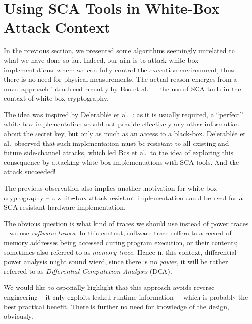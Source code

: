 \section{Using SCA Tools in White-Box Attack Context}
\label{sec:scawbc}

In the previous section, we presented some algorithms seemingly unrelated to what we have done so far. Indeed, our aim is to attack white-box implementations, where we can fully control the execution environment, thus there is no need for physical measurements. The actual reason emerges from a novel approach introduced recently by Bos et al.\ \cite{bos2015differential} -- the use of SCA tools in the context of white-box cryptography.

The idea was inspired by Delerabl{\'e}e et al.\ \cite{delerablee2013white}: as it is usually required, a ``perfect'' white-box implementation should not provide effectively any other information about the secret key, but only as much as an access to a black-box. Delerabl{\'e}e et al.\ observed that such implementation must be resistant to all existing and future side-channel attacks, which led Bos et al.\ to the idea of exploring this consequence by attacking white-box implementations with SCA tools. And the attack succeeded!

\begin{note}
\label{note:motiv}
	The previous observation also implies another motivation for white-box cryptography -- a white-box attack resistant implementation could be used for a SCA-resistant hardware implementation.
\end{note}

The obvious question is what kind of traces we should use instead of power traces -- we use {\em software traces}. In this context, software trace reffers to a record of memory addresses being accessed during program execution, or their contents; sometimes also referred to as {\em memory trace}. Hence in this context, differential power analysis might sound wierd, since there is no {\em power}, it will be rather referred to as {\em Differential Computation Analysis} (DCA).

\begin{remark}
\label{rem:benefit}
	We would like to especially highlight that this approach avoids reverse engineering -- it only exploits leaked runtime information --, which is probably the best practical benefit. There is further no need for knowledge of the design, obviously.
\end{remark}

